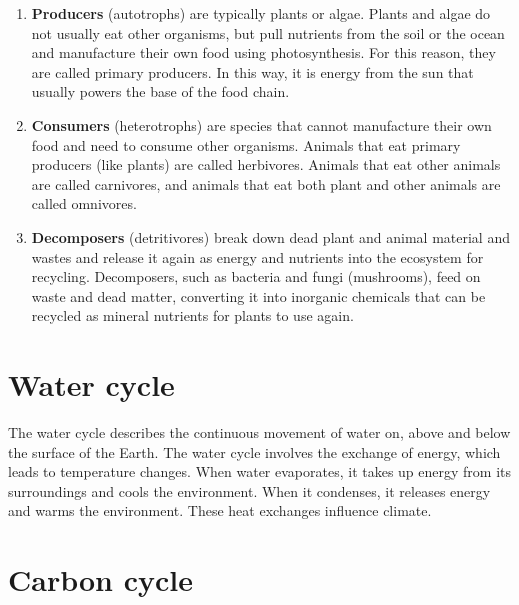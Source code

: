 \documentclass[]{book}
\providecommand{\tightlist}{%
  \setlength{\itemsep}{0pt}\setlength{\parskip}{0pt}}
\begin{document}
\begin{enumerate}
\def\labelenumi{\arabic{enumi}.}
\tightlist
\item
  \textbf{Producers} (autotrophs) are typically plants or algae. Plants
  and algae do not usually eat other organisms, but pull nutrients from
  the soil or the ocean and manufacture their own food using
  photosynthesis. For this reason, they are called primary producers. In
  this way, it is energy from the sun that usually powers the base of
  the food chain.
\item
  \textbf{Consumers} (heterotrophs) are species that cannot manufacture
  their own food and need to consume other organisms. Animals that eat
  primary producers (like plants) are called herbivores. Animals that
  eat other animals are called carnivores, and animals that eat both
  plant and other animals are called omnivores.
\item
  \textbf{Decomposers} (detritivores) break down dead plant and animal
  material and wastes and release it again as energy and nutrients into
  the ecosystem for recycling. Decomposers, such as bacteria and fungi
  (mushrooms), feed on waste and dead matter, converting it into
  inorganic chemicals that can be recycled as mineral nutrients for
  plants to use again.
\end{enumerate}

\section{Water cycle}\label{water-cycle}

The water cycle describes the continuous movement of water on, above and
below the surface of the Earth. The water cycle involves the exchange of
energy, which leads to temperature changes. When water evaporates, it
takes up energy from its surroundings and cools the environment. When it
condenses, it releases energy and warms the environment. These heat
exchanges influence climate.

\section{Carbon cycle}\label{carbon-cycle}
\end{document}
